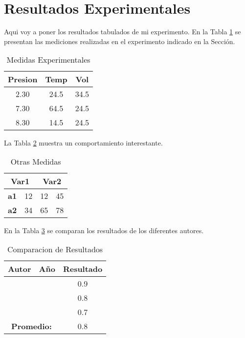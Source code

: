 \section{Resultados Experimentales}
Aqui voy a poner los resultados tabulados de mi experimento. En la Tabla \ref{tab:mis_mediciones} se presentan las mediciones realizadas en el experimento indicado en la Sección.

\begin{table}[htbp]
    \centering
    \caption{Medidas Experimentales}
    \begin{tabular}{|ccc|}
        \hline
        \textbf{Presion} & \textbf{Temp} & \textbf{Vol}  \\ \hline
         2.30   &  24.5 & 34.5 \\
         7.30   &  64.5 & 24.5 \\
         8.30   &  14.5 & 24.5 \\ \hline
    \end{tabular}
    \label{tab:mis_mediciones}
\end{table}{}

La Tabla \ref{tab:mis_otras_mediciones} muestra un comportamiento interestante.

\begin{table}[h!]
\centering
\caption{Otras Medidas}
\begin{tabular}{ll|ll}
\multicolumn{2}{c|}{\textbf{Var1}} & \multicolumn{2}{c}{\textbf{Var2}} \\ \hline
\textbf{a1}          & 12          & 12              & 45              \\
\textbf{a2}          & 34          & 65              & 78             
\end{tabular}
\label{tab:mis_otras_mediciones}
\end{table}

En la Tabla \ref{tab:comparacion} se comparan los resultados de los diferentes autores. 

\begin{table}[h!]
\centering
\caption{Comparacion de Resultados}
\begin{tabular}{ccc}
\textbf{Autor}    & \textbf{Año}    & \textbf{Resultado} \\ \hline
    \citeauthor{priandana2018backprop} &    \citeyear{priandana2018backprop} & 0.9                \\
    \citeauthor{dawkins_biology_2016}  &    \citeyear{dawkins_biology_2016}  & 0.8                \\
    \citeauthor{nogueira2017image}     &    \citeyear{nogueira2017image}     & 0.7                \\ \hline
\multicolumn{2}{c}{\textbf{Promedio:}} & 0.8               
\end{tabular}
\label{tab:comparacion}
\end{table}

